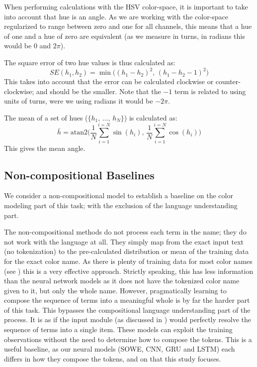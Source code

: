 When performing calculations with the HSV color-space, it is important to take into account that hue is an angle.
As we are working with the color-space regularized to range between zero and one for all channels,
this means that a hue of one and a hue of zero are equivalent (as we measure in turns, in radians this would be $0$ and $2\pi$).

The square error of two hue values is thus calculated as:
\begin{equation}
SE(h_1, h_2) = \min \big( \left(h_1 - h_2 \right)^2, \, \left(h_1 - h_2 -1 \right)^2  \big)
\end{equation}
This takes into account that the error can be calculated clockwise or counter-clockwise; and should be the smaller.
Note that the $-1$ term is related to using units of turns, were we using radians it would be $-2\pi$.


The mean of a set of hues ($\lbrace h_1,\,\ldots,\,h_N \rbrace$) is calculated as:
\begin{equation}
\bar h = \mathrm{atan2} \Bigg(%
	\frac{1}{N} \sum_{i=1}^{i=N} \sin (h_i), \,  %
	\frac{1}{N} \sum_{i=1}^{i=N} \cos (h_i)%
\Bigg)%
\end{equation}
This gives the mean angle.



\subsection{Non-compositional Baselines}
We consider a non-compositional model to establish a baseline on the color modeling part of this task; with the exclusion of the language understanding part.

The non-compositional methods do not process each term in the name; they do not work with the language at all.
They simply map from the exact input text (no tokenization) to the pre-calculated distribution or mean of the training data for the exact color name.
As there is plenty of training data for most color names (see ) this is a very effective approach.
%
Strictly speaking, this \empmodel{} has less information than the neural network models
as it does not have the tokenized color name given to it, but only the whole name.
However, pragmatically learning to compose the sequence of terms into a meaningful whole is by far the harder part of this task.
%
This \empmodel{} bypasses the compositional language understanding part of the process.
It is as if the input module (as discussed in ) would perfectly resolve the sequence of terms into a single item.
%
These models can exploit the training observations without the need to determine how to compose the tokens.
This is a useful baseline, as our neural models (SOWE, CNN, GRU and LSTM)
each differs in how they compose the tokens, and on that this study focuses.

